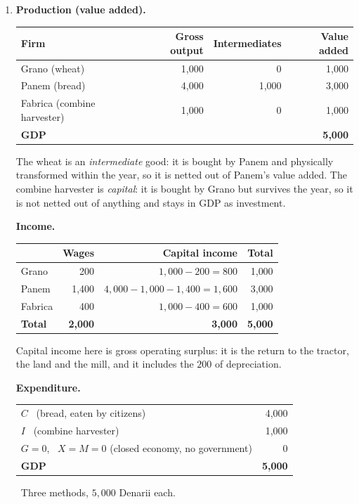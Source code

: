 \documentclass[12pt, letterpaper]{article}
\begin{document}
\begin{tcolorbox}[evenbox,title={Problem 5.8 \quad National Accounts and The Golden Rule}]
\begin{enumerate}
\item \textbf{Production (value added).}
\begin{center}
\begin{tabular}{@{}lrrr@{}}
\toprule
Firm & Gross output & Intermediates & Value added \\
\midrule
Grano (wheat)             & 1{,}000 & 0       & 1{,}000 \\
Panem (bread)             & 4{,}000 & 1{,}000 & 3{,}000 \\
Fabrica (combine harvester)& 1{,}000 & 0       & 1{,}000 \\
\midrule
\textbf{GDP} & & & \textbf{5{,}000} \\
\bottomrule
\end{tabular}
\end{center}
The wheat is an \emph{intermediate} good: it is bought by Panem and physically transformed
within the year, so it is netted out of Panem's value added. The combine harvester is
\emph{capital}: it is bought by Grano but survives the year, so it is not netted out of
anything and stays in GDP as investment.

\smallskip
\textbf{Income.}
\begin{center}
\begin{tabular}{@{}lrrr@{}}
\toprule
 & Wages & Capital income & Total \\
\midrule
Grano   & 200   & $1{,}000-200=800$   & 1{,}000 \\
Panem   & 1{,}400 & $4{,}000-1{,}000-1{,}400=1{,}600$ & 3{,}000 \\
Fabrica & 400   & $1{,}000-400=600$   & 1{,}000 \\
\midrule
\textbf{Total} & \textbf{2{,}000} & \textbf{3{,}000} & \textbf{5{,}000} \\
\bottomrule
\end{tabular}
\end{center}
Capital income here is gross operating surplus: it is the return to the tractor, the land and
the mill, and it includes the $200$ of depreciation.

\smallskip
\textbf{Expenditure.}
\begin{center}
\begin{tabular}{@{}lr@{}}
\toprule
$C$ \ (bread, eaten by citizens) & 4{,}000 \\
$I$ \ (combine harvester) & 1{,}000 \\
$G=0$, \ $X=M=0$ (closed economy, no government) & 0 \\
\midrule
\textbf{GDP} & \textbf{5{,}000} \\
\bottomrule
\end{tabular}
\end{center}
\checkmark\ Three methods, $5{,}000$ Denarii each.


\end{enumerate}
\end{tcolorbox}
\end{document}
